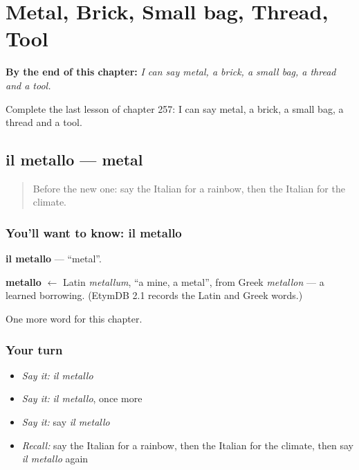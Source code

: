 
\chapter{Metal, Brick, Small bag, Thread, Tool}
\label{ch:it-metal-brick-small-bag-thread-tool}

\begin{chapteropening}
\textbf{By the end of this chapter:} \emph{I can say metal, a brick, a small bag, a thread and a tool.}

Complete the last lesson of chapter 257: I can say metal, a brick, a small bag, a thread and a tool.
\end{chapteropening}

\section[il metallo]{il metallo — metal}

\label{lesson:IT-C257-metallo}



\begin{quote}
Before the new one: say the Italian for a rainbow, then the Italian for the climate.
\end{quote}

\subsection*{You'll want to know: il metallo}
\textbf{il metallo} — \textquotedblleft{}metal\textquotedblright{}.

\begin{cousinweb}
\textbf{metallo} $\leftarrow$ Latin \emph{metallum}, \textquotedblleft{}a mine, a metal\textquotedblright{}, from Greek \emph{metallon} — a learned borrowing. (EtymDB 2.1 records the Latin and Greek words.)
\end{cousinweb}

\begin{grammarlens}[title={What you've built}]
One more word for this chapter.
\end{grammarlens}

\subsection*{Your turn}
\begin{itemize}
\raggedright
  \item \emph{Say it:} \emph{il metallo}
  \item \emph{Say it:} \emph{il metallo}, once more
  \item \emph{Say it:} say \emph{il metallo}
  \item \emph{Recall:} say the Italian for a rainbow, then the Italian for the climate, then say \emph{il metallo} again
\end{itemize}

